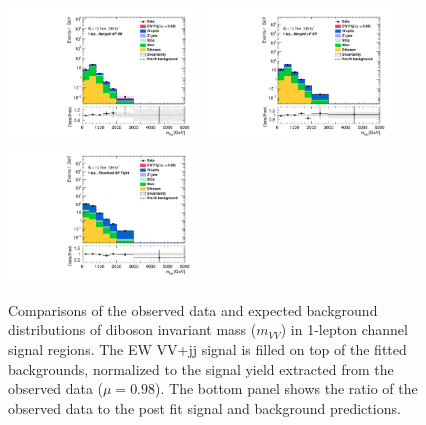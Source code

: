 \begin{figure}[]
    \centering
    \includegraphics[width=0.45\textwidth]{figures/PostFit/Region_distMVV_DSRVBSHP_BMin0_J0_incJet1_L1_T0_incFat1_Y6051_incTag1_Fat1_GlobalFit_unconditionnal_mu1log.pdf}
    \includegraphics[width=0.45\textwidth]{figures/PostFit/Region_distMVV_DSRVBSLP_BMin0_J0_incJet1_L1_T0_incFat1_Y6051_incTag1_Fat1_GlobalFit_unconditionnal_mu1log.pdf}
    \includegraphics[width=0.45\textwidth]{figures/PostFit/Region_distMVV_DSRVBSTight_BMin0_T0_Y6051_incTag1_J2_L1_incJet1_GlobalFit_unconditionnal_mu1log.pdf}
      \caption{Comparisons of the observed data and expected background distributions of diboson invariant mass ($m_{VV}$) in 1-lepton channel signal regions. The EW VV+jj signal is filled on top of the fitted backgrounds, normalized to the signal yield extracted from the observed data ($\mu = 0.98$). The bottom panel shows the ratio of the observed data to the post fit signal and background predictions.}
      \label{fig:postSR1lepmvv}
\end{figure}

